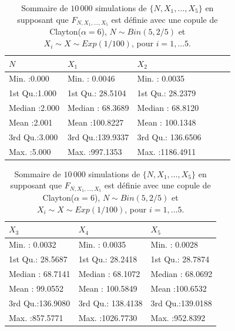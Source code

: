 \documentclass{article}
\begin{document}
	\begin{table}[H]
		\centering
		\begin{tabular}[width=\textwidth]{llllll}
			\hline
			       $N$ &       $X_1$ &       $X_2$ &             \\ 
			\hline
			Min.   :0.000   & Min.   :  0.0046   & Min.   :   0.0035      \\ 
			1st Qu.:1.000   & 1st Qu.: 28.5104   & 1st Qu.:  28.2379      \\ 
			Median :2.000   & Median : 68.3689   & Median :  68.8120      \\ 
			Mean   :2.001   & Mean   :100.8227   & Mean   : 100.1348      \\ 
			3rd Qu.:3.000   & 3rd Qu.:139.9337   & 3rd Qu.: 136.6506      \\ 
			Max.   :5.000   & Max.   :997.1353   & Max.   :1186.4911      \\ 
			\hline
		\end{tabular}
		\begin{tabular}[width=\textwidth]{lll}
			\hline
			       $X_3$ &       $X_4$ &       $X_5$ \\ 
			\hline
			 Min.   :  0.0032   & Min.   :   0.0035   & Min.   :  0.0028   \\ 
			 1st Qu.: 28.5687   & 1st Qu.:  28.2418   & 1st Qu.: 28.7874   \\ 
			 Median : 68.7141   & Median :  68.1072   & Median : 68.0692   \\ 
			 Mean   : 99.0552   & Mean   : 100.5849   & Mean   :100.6532   \\ 
			 3rd Qu.:136.9080   & 3rd Qu.: 138.4138   & 3rd Qu.:139.0188   \\ 
			 Max.   :857.5771   & Max.   :1026.7730   & Max.   :952.8392   \\ 
			\hline
		\end{tabular}
	\caption[Sommaire des données simulées pour une copule de Clayton avec une loi de fréquence binomiale.]{Sommaire de $10\,000$ simulations de $\{N, X_1, \dots, X_5\}$ en supposant que $F_{N,X_1,\dots, X_5}$ est définie avec une copule de Clayton($\alpha=6$), $N \sim Bin(5, 2/5)$ et $X_i \sim X \sim Exp(1/100)$, pour $i=1,\dots 5$.}
	\label{tbl_sommaire_Clayton_Binom}
	\end{table}
\end{document}
